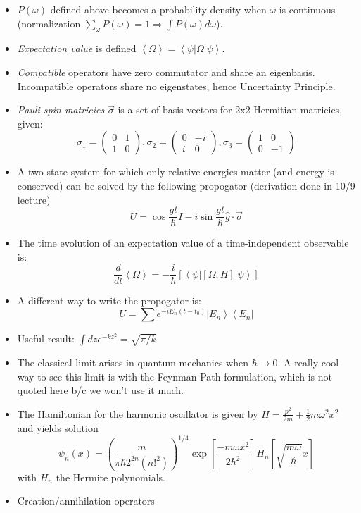 \documentclass[10pt]{report}
\newcommand{\bra}[1]{\left<#1\right|}
\newcommand{\ket}[1]{\left|#1\right>}
\newcommand{\rd}[2]{\frac{d#1}{d#2}}
\newcommand{\expvalue}[1]{\left<#1\right>}
\begin{document}
\begin{itemize}
	\item $P(\omega)$ defined above becomes a probability density when $\omega$ is continuous (normalization $\sum_\omega P(\omega)=1 \Rightarrow \int P(\omega) d\omega$). 
	\item \emph{Expectation value} is defined $\expvalue{\Omega}=\bra{\psi}\Omega\ket{\psi}$.
	\item \emph{Compatible} operators have zero commutator and share an eigenbasis. Incompatible operators share no eigenstates, hence Uncertainty Principle.
	\item \emph{Pauli spin matricies} $\vec{\sigma}$ is a set of basis vectors for 2x2 Hermitian matricies, given:
		$$\sigma_1 = \begin{pmatrix}0&1\\1&0\end{pmatrix},\sigma_2=\begin{pmatrix}0&-i\\i&0\end{pmatrix},\sigma_3=\begin{pmatrix}1&0\\0&-1\end{pmatrix}$$
	\item A two state system for which only relative energies matter (and energy is conserved) can be solved by the following propogator (derivation done in 10/9 lecture)
		$$U= \cos\frac{gt}{\hbar}I - i\sin \frac{gt}{\hbar} \hat{g}\cdot\vec{\sigma}$$
	\item The time evolution of an expectation value of a time-independent observable is:
		$$\rd{}{t}\expvalue{\Omega} =-\frac{i}{\hbar}\left[ \bra{\psi} \left[ \Omega,H \right]\ket{\psi} \right]$$
	\item A different way to write the propogator is:
					$$U = \sum e^{-iE_n(t-t_0)}\ket{E_n}\bra{E_n}$$
	\item Useful result: $\int dz e^{-kz^2} = \sqrt{\pi/k}$
	\item The classical limit arises in quantum mechanics when $\hbar \to 0$. A really cool way to see this limit is with the Feynman Path formulation, which is not quoted here b/c we won't use it much.
	\item The Hamiltonian for the harmonic oscillator is given by $H=\frac{p^2}{2m} + \frac{1}{2}m\omega^2x^2$ and yields solution 
		$$\psi_n(x) = \left( \frac{m}{\pi\hbar 2^{2n}(n!^2)} \right)^{1/4} \exp \left[ \frac{-m\omega x^2}{2\hbar^2} \right]H_n\left[ \sqrt{\frac{m\omega}{\hbar}}x \right]$$
        with $H_n$ the Hermite polynomials.
	\item Creation/annihilation operators

\end{itemize}
\end{document}

